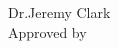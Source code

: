 \begin{titlepage}
{    \hspace*{77pt}Dr.\@ Jeremy Clark\\[2.5ex]
    Approved by \hspace{9pt}\underline{\hspace{232pt}}\\

}
  \end{titlepage}

